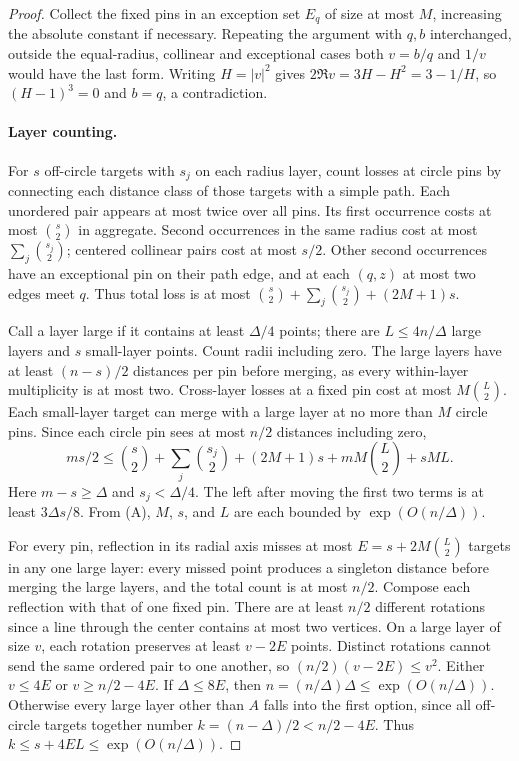 \begin{proof}
Collect the fixed pins in an exception set \(E_q\) of size at most \(M\), increasing the absolute constant if necessary. Repeating the argument with \(q,b\) interchanged, outside the equal-radius, collinear and exceptional cases both \(v=b/q\) and \(1/v\) would have the last form. Writing \(H=|v|^2\) gives \(2\Re v=3H-H^2=3-1/H\), so \((H-1)^3=0\) and \(b=q\), a contradiction.

\paragraph{Layer counting.}
For \(s\) off-circle targets with \(s_j\) on each radius layer, count losses at circle pins by connecting each distance class of those targets with a simple path. Each unordered pair appears at most twice over all pins. Its first occurrence costs at most \(\binom s2\) in aggregate. Second occurrences in the same radius cost at most \(\sum_j\binom{s_j}{2}\); centered collinear pairs cost at most \(s/2\). Other second occurrences have an exceptional pin on their path edge, and at each \((q,z)\) at most two edges meet \(q\). Thus total loss is at most \(\binom s2+\sum_j\binom{s_j}{2}+(2M+1)s\).

Call a layer large if it contains at least \(\Delta/4\) points; there are \(L\le4n/\Delta\) large layers and \(s\) small-layer points. Count radii including zero. The large layers have at least \((n-s)/2\) distances per pin before merging, as every within-layer multiplicity is at most two. Cross-layer losses at a fixed pin cost at most \(M\binom L2\). Each small-layer target can merge with a large layer at no more than \(M\) circle pins. Since each circle pin sees at most \(n/2\) distances including zero,
\[
 ms/2\le\binom s2+\sum_j\binom{s_j}{2}+(2M+1)s+mM\binom L2+sML .
\]
Here \(m-s\ge\Delta\) and \(s_j<\Delta/4\). The left after moving the first two terms is at least \(3\Delta s/8\). From (A), \(M\), \(s\), and \(L\) are each bounded by \(\exp(O(n/\Delta))\).

For every pin, reflection in its radial axis misses at most \(E=s+2M\binom L2\) targets in any one large layer: every missed point produces a singleton distance before merging the large layers, and the total count is at most \(n/2\). Compose each reflection with that of one fixed pin. There are at least \(n/2\) different rotations since a line through the center contains at most two vertices. On a large layer of size \(v\), each rotation preserves at least \(v-2E\) points. Distinct rotations cannot send the same ordered pair to one another, so \((n/2)(v-2E)\le v^2\). Either \(v\le4E\) or \(v\ge n/2-4E\). If \(\Delta\le8E\), then \(n=(n/\Delta)\Delta\le\exp(O(n/\Delta))\). Otherwise every large layer other than \(A\) falls into the first option, since all off-circle targets together number \(k=(n-\Delta)/2<n/2-4E\). Thus \(k\le s+4EL\le\exp(O(n/\Delta))\).


\end{proof}
